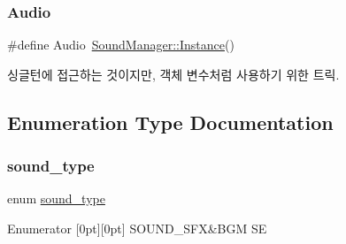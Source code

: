 \subsubsection{\texorpdfstring{Audio}{Audio}}
{\footnotesize\ttfamily \#define Audio~\mbox{\hyperlink{class_sound_manager_a9cf8d653de9d00018fdd646654d2024b}{Sound\+Manager\+::\+Instance}}()}

싱글턴에 접근하는 것이지만, 객체 변수처럼 사용하기 위한 트릭. 

\subsection{Enumeration Type Documentation}
\mbox{\label{group___sound_module_gadfb4b3d4c43f1e78a1e95150ca37fd1e}} 
\subsubsection{\texorpdfstring{sound\_type}{sound\_type}}
{\footnotesize\ttfamily enum \mbox{\hyperlink{group___sound_module_gadfb4b3d4c43f1e78a1e95150ca37fd1e}{sound\+\_\+type}}}

\begin{DoxyEnumFields}{Enumerator}
[0pt][0pt]{}\mbox{\label{group___sound_module_ggadfb4b3d4c43f1e78a1e95150ca37fd1eaaa0a70ddaa3102f56f8aa3c334f8f8b1}} 
S\+O\+U\+N\+D\+\_\+\+S\+FX&B\+GM SE \\
\hline

\end{DoxyEnumFields}
